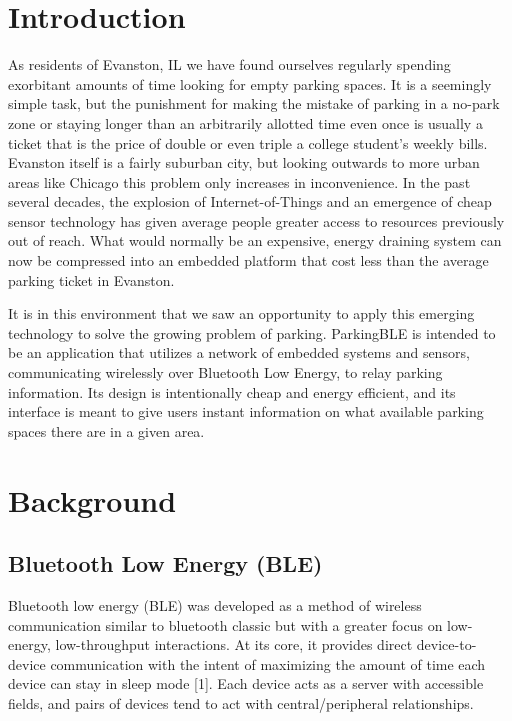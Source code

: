 \documentclass[sigconf]{acmart}
\begin{document}


\maketitle


\section{Introduction}
As residents of Evanston, IL we have found ourselves regularly spending exorbitant amounts of
time looking for empty parking spaces. It is a seemingly simple task, but the punishment for
making the mistake of parking in a no-park zone or staying longer than an arbitrarily allotted
time even once is usually a ticket that is the price of double or even triple a college student's
weekly bills. Evanston itself is a fairly suburban city, but looking outwards to more urban areas
like Chicago this problem only increases in inconvenience. In the past several decades, the
explosion of Internet-of-Things and an emergence of cheap sensor technology has given average
people greater access to resources previously out of reach. What would normally be an expensive,
energy draining system can now be compressed into an embedded platform that cost less than the
average parking ticket in Evanston. \newline

It is in this environment that we saw an opportunity to apply this emerging technology to solve
the growing problem of parking. ParkingBLE is intended to be an application that utilizes a network
of embedded systems and sensors, communicating wirelessly over Bluetooth Low Energy, to relay
parking information. Its design is intentionally cheap and energy efficient, and its interface is
meant to give users instant information on what available parking spaces there are in a given area.

\section{Background}

\subsection{Bluetooth Low Energy (BLE)}
Bluetooth low energy (BLE) was developed as a method of wireless communication similar to bluetooth
classic but with a greater focus on low-energy, low-throughput interactions. At its core, it
provides direct device-to-device communication with the intent of maximizing the amount of time each device can stay
in sleep mode [1]. Each device acts as a server with accessible fields,
and pairs of devices tend to act with central/peripheral relationships.\newline
\end{document}
